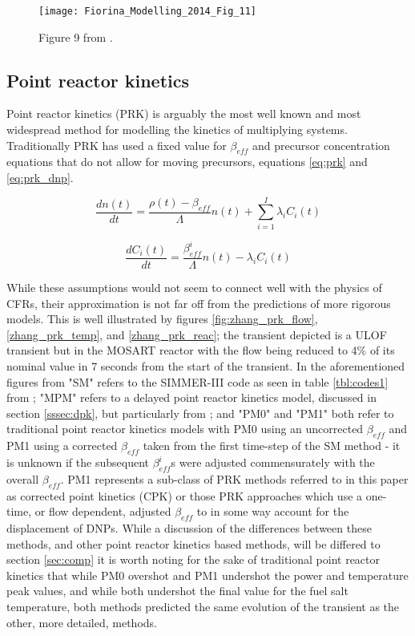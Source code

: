 \documentclass[review]{elsarticle}
\begin{document}
\begin{figure}[h]
   \centering
   \texttt{[image: Fiorina\_Modelling\_2014\_Fig\_11]}
   \caption{Figure 9 from \cite{fiorina_modelling_2014}.} 
   \label{fig:fiorina_msfr_ulof}
\end{figure}

\subsection{Point reactor kinetics} \label{ssec:prk}
Point reactor kinetics (PRK) is arguably the most well known and most widespread
method for modelling the kinetics of multiplying systems. Traditionally PRK
has used a fixed value for $\beta_{eff}$ and precursor concentration equations
that do not allow for moving precursors, equations \ref{eq:prk} and
\ref{eq:prk_dnp}.

\begin{equation}
    \label{eq:prk}
    \frac{dn(t)}{dt} = \frac{\rho(t) - \beta_{eff}}{\Lambda} n(t) +
     \sum_{i = 1}^{I} \lambda_{i} C_{i}(t)
\end{equation}

\begin{equation}
    \label{eq:prk_dnp}
    \frac{dC_{i}(t)}{dt} = \frac{\beta_{eff}^{i}}{\Lambda} n(t) -
        \lambda_{i} C_{i}(t)
\end{equation}

While these assumptions would not seem to connect well
with the physics of CFRs, their approximation is not far off from the
predictions of more rigorous models. This is well illustrated by figures
\ref{fig:zhang_prk_flow}, \ref{zhang_prk_temp}, and \ref{zhang_prk_reac};
the transient depicted is a ULOF transient but in the MOSART reactor with the
flow being reduced to 4\% of its nominal value in 7 seconds from the start
of the transient. In
the aforementioned figures from \cite{zhang_comparison_2009} "SM" refers
to the SIMMER-III code as seen in table \ref{tbl:codes1} from
\cite{rineiski_kinetics_2005}; "MPM" refers to a delayed point reactor kinetics
model, discussed in section \ref{sssec:dpk}, but particularly from
\cite{suzuki_reactivity-initiated-accident_2008}; and "PM0" and "PM1" both
refer to traditional point reactor kinetics models with PM0 using an
uncorrected $\beta_{eff}$ and PM1 using a corrected $\beta_{eff}$ taken from
the first time-step of the SM method - it is unknown if the subsequent
$\beta_{eff}^{i}$s were adjusted commensurately with the overall $\beta_{eff}$.
PM1 represents a sub-class of PRK methods referred to in this paper as
corrected point kinetics (CPK) or those PRK approaches which use a one-time, or
flow dependent, adjusted $\beta_{eff}$ to in some way account for the
displacement of DNPs.
While a discussion of the differences between these methods, and other point
reactor kinetics based methods, will be differed to section \ref{sec:comp}
it is worth noting for the sake of traditional point reactor kinetics that
while PM0 overshot and PM1 undershot the power and temperature peak values, and
while both undershot the final value for the fuel salt temperature, both methods
predicted the same evolution of the transient as the other, more detailed,
methods.
\end{document}
